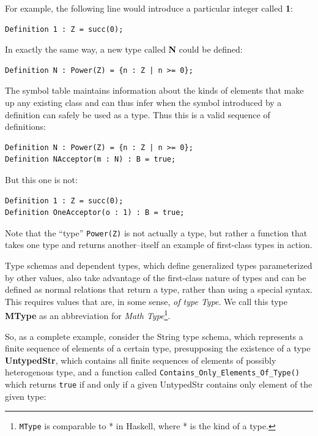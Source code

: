 For example, the following line would introduce a particular integer called \textbf{1}:

\begin{lstlisting}
Definition 1 : Z = succ(0);
\end{lstlisting}

In exactly the same way, a new type called \textbf{N} could be defined:

\begin{lstlisting}
Definition N : Power(Z) = {n : Z | n >= 0};
\end{lstlisting}

The symbol table maintains information about the kinds of elements that make up any existing class and can thus infer when the symbol introduced by a definition can safely be used as a type.  Thus this is a valid sequence of definitions:

\begin{lstlisting}
Definition N : Power(Z) = {n : Z | n >= 0};
Definition NAcceptor(m : N) : B = true;
\end{lstlisting}

But this one is not:

\begin{lstlisting}
Definition 1 : Z = succ(0);
Definition OneAcceptor(o : 1) : B = true;
\end{lstlisting}

Note that the ``type'' \texttt{Power(Z)} is not actually a type, but rather a function that takes one type and returns another--itself an example of first-class types in action.

Type schemas and dependent types, which define generalized types parameterized by other values, also take advantage of the first-class nature of types and can be defined as normal relations that return a type, rather than using a special syntax.  This requires values that are, in some sense, \emph{of type Type}.  We call this type \textbf{MType} as an abbreviation for \emph{Math Type}\footnote{\texttt{MType} is comparable to * in Haskell, where * is the kind of a type.}.

\begin{sloppypar}
So, as a complete example, consider the String type schema, which represents a finite sequence of elements of a certain type, presupposing the existence of a type \textbf{UntypedStr}, which contains all finite sequences of elements of possibly heterogenous type, and a function called \texttt{Contains\_Only\_Elements\_Of\_Type()} which returns \texttt{true} if and only if a given UntypedStr contains only element of the given type:
\end{sloppypar}


